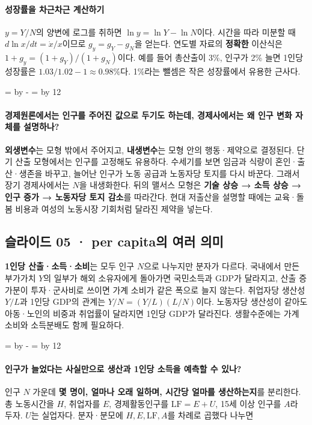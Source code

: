 \documentclass[10pt,a4paper]{article}
\newcommand{\ReserveQuestionSpace}{%
  \par\begingroup
  \dimen0=\pagegoal \advance\dimen0 by -\pagetotal
  \dimen2=\baselineskip \multiply\dimen2 by 12
  \ifdim\dimen0<\dimen2 \newpage\fi
  \endgroup}
\begin{document}
\paragraph{성장률을 차근차근 계산하기}

$y=Y/N$의 양변에 로그를 취하면 $\ln y=\ln Y-\ln N$이다. 시간을 따라 미분할 때 $d\ln x/dt=\dot x/x$이므로 $g_y=g_Y-g_N$을 얻는다. 연도별 자료의 \textbf{정확한} 이산식은 $1+g_y=(1+g_Y)/(1+g_N)$이다. 예를 들어 총산출이 3\%, 인구가 2\% 늘면 1인당 성장률은 $1.03/1.02-1\approx0.98\%$다. 1\%라는 뺄셈은 작은 성장률에서 유용한 근사다.\par

\ReserveQuestionSpace
\paragraph{경제원론에서는 인구를 주어진 값으로 두기도 하는데, 경제사에서는 왜 인구 변화 자체를 설명하나?}
\textbf{외생변수}는 모형 밖에서 주어지고, \textbf{내생변수}는 모형 안의 행동·제약으로 결정된다. 단기 산출 모형에서는 인구를 고정해도 유용하다. 수세기를 보면 임금과 식량이 혼인·출산·생존을 바꾸고, 늘어난 인구가 노동 공급과 노동자당 토지를 다시 바꾼다. 그래서 장기 경제사에서는 $N$을 내생화한다. 뒤의 맬서스 모형은 \textbf{기술 상승 → 소득 상승 → 인구 증가 → 노동자당 토지 감소}를 따라간다. 현대 저출산을 설명할 때에는 교육·돌봄 비용과 여성의 노동시장 기회처럼 달라진 제약을 넣는다.\par

\subsection{슬라이드 05 · per capita의 여러 의미}
\textbf{1인당 산출·소득·소비}는 모두 인구 $N$으로 나누지만 분자가 다르다. 국내에서 만든 부가가치 $Y$의 일부가 해외 소유자에게 돌아가면 국민소득과 GDP가 달라지고, 산출 증가분이 투자·군사비로 쓰이면 가계 소비가 같은 폭으로 늘지 않는다. 취업자당 생산성 $Y/L$과 1인당 GDP의 관계는 $Y/N=(Y/L)(L/N)$이다. 노동자당 생산성이 같아도 아동·노인의 비중과 취업률이 달라지면 1인당 GDP가 달라진다. 생활수준에는 가계 소비와 소득분배도 함께 필요하다.\par

\ReserveQuestionSpace
\paragraph{인구가 늘었다는 사실만으로 생산과 1인당 소득을 예측할 수 있나?}
인구 $N$ 가운데 \textbf{몇 명이, 얼마나 오래 일하며, 시간당 얼마를 생산하는지}를 분리한다. 총 노동시간을 $H$, 취업자를 $E$, 경제활동인구를 $\mathrm{LF}=E+U$, 15세 이상 인구를 $A$라 두자. $U$는 실업자다. 분자·분모에 $H,E,\mathrm{LF},A$를 차례로 곱했다 나누면\par
\end{document}
